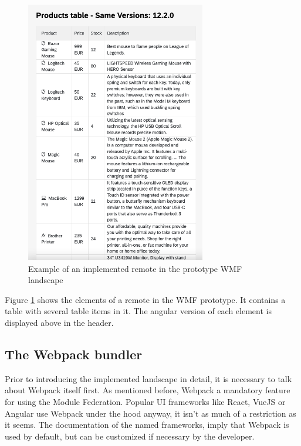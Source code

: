 \begin{figure}[!h]
	\centering
	\includegraphics[width=0.7\textwidth]{Figures/WMF_SameVersions.png}
	\caption{Example of an implemented remote in the prototype WMF landscape}
	\label{fig:wmf_screenshot}
\end{figure}

Figure \ref{fig:wmf_screenshot} shows the elements of a remote in the WMF prototype. It contains a table with several table items in it. The angular version of each element is displayed above in the header.

 \subsection{The Webpack bundler}
 
Prior to introducing the implemented landscape in detail, it is necessary to talk about Webpack itself first. As mentioned before, Webpack a mandatory feature for using the Module Federation. Popular UI frameworks like React, VueJS or Angular use Webpack under the hood anyway, it isn't as much of a restriction as it seems.\cite{webpack_angular}\cite{webpack_react}\cite{webpack_vue}
The documentation of the named frameworks, imply that Webpack is used by default, but can be customized if necessary by the developer.

